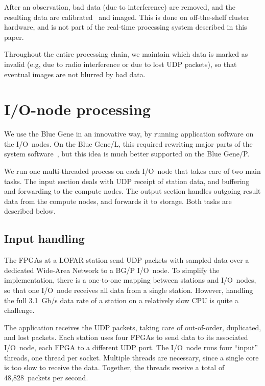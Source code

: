 \documentclass[conference]{IEEEtran}
\begin{document}
After an observation, bad data (due to interference) are removed, and the
resulting data are calibrated~\cite{Nijboer:07} and imaged.
This is done on off-the-shelf cluster hardware, and is not part of the
real-time processing system described in this paper.




Throughout the entire processing chain, we maintain which data is marked as
invalid (e.g, due to radio interference or due to lost UDP packets), so that
eventual images are not blurred by bad data.






\section{I/O-node processing}

We use the Blue Gene in an innovative way, by running application software
on the I/O~nodes.
On the Blue Gene/L, this required rewriting major parts of the system
software~\cite{Iskra:08}, but this idea is much better supported on the
Blue Gene/P.

We run one multi-threaded process on each I/O~node that takes care of two main tasks.
The input section deals with UDP receipt of station data, and buffering and forwarding to the compute nodes.
The output section handles outgoing result data from the compute nodes, and forwards it to storage.
Both tasks are described below.


\subsection{Input handling}

The FPGAs at a LOFAR station send UDP packets with sampled data over a
dedicated Wide-Area Network to a BG/P I/O~node.
To simplify the implementation, there is a one-to-one mapping between
stations and I/O~nodes, so that one I/O~node receives all data from a single
station.
However, handling the full 3.1~Gb/s data rate of a station on a relatively
slow CPU is quite a challenge.

The application receives the UDP packets, taking care of out-of-order,
duplicated, and lost packets.
Each station uses four FPGAs to send data to its associated I/O~node,
each FPGA to a different UDP port.
The I/O~node runs four ``input'' threads, one thread per socket.
Multiple threads are necessary, since a single core is too slow
to receive the data. Together, the threads receive a total of 48,828~packets per second.
\end{document}
